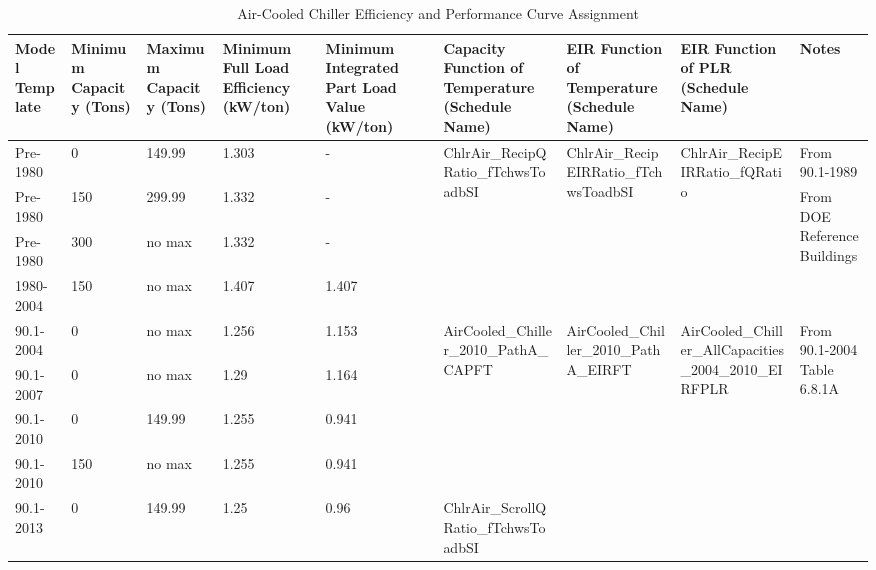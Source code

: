 \begin{table}
\scriptsize
\centering
\caption{Air-Cooled Chiller Efficiency and Performance Curve Assignment}
\label{tab:acc_efficiencies}
\begin{tabular}{|p{0.6in}|p{0.4in}|p{0.4in}|p{0.4in}|p{0.4in}|p{0.6in}|p{0.6in}|p{0.6in}|p{0.6in}|}
\hline
\textbf{Model Template} &
  \textbf{Minimum Capacity (Tons)} &
  \textbf{Maximum Capacity (Tons)} &
  \textbf{Minimum Full   Load Efficiency (kW/ton)} &
  \textbf{Minimum   Integrated Part Load Value (kW/ton)} &
  \textbf{Capacity Function of Temperature (Schedule Name)} &
  \textbf{EIR Function of Temperature  (Schedule Name)} &
  \textbf{EIR Function of PLR (Schedule Name)} &
  \textbf{Notes} \\ \hline
Pre-1980 & 0 & 149.99 & 1.303 & - &
  \multirow{4}{*}{\parbox{0.6in}{ChlrAir\_RecipQRatio\_fTchwsToadbSI}} &
  \multirow{4}{*}{\parbox{0.6in}{ChlrAir\_RecipEIRRatio\_fTchwsToadbSI}} &
  \multirow{4}{*}{\parbox{0.6in}{ChlrAir\_RecipEIRRatio\_fQRatio}} & From   90.1-1989 \\ \cline{1-5} \cline{9-9} 
Pre-1980  & 150 & 299.99   & 1.332 & -     &  &  &  & \multirow{3}{*}{\parbox{0.6in}{From DOE Reference Buildings}} \\ \cline{1-5}
Pre-1980  & 300 & no max   & 1.332 & -     &  &  &  &                                               \\ \cline{1-5}
1980-2004 & 150 & no max   & 1.407 & 1.407 &  &  &  &                                               \\ \hline
90.1-2004 &  0 & no max    & 1.256 & 1.153 &
  \multirow{4}{*}{\parbox{0.6in}{AirCooled\_Chiller\_2010\_PathA\_CAPFT}} &
  \multirow{4}{*}{\parbox{0.6in}{AirCooled\_Chiller\_2010\_PathA\_EIRFT}} &
  \multirow{4}{*}{\parbox{0.6in}{AirCooled\_Chiller\_AllCapacities\_2004\_2010\_EIRFPLR}} &
  \multirow{4}{*}{\parbox{0.6in}{From 90.1-2004 Table 6.8.1A}} \\ \cline{1-5}
90.1-2007         & 0   & no max   & 1.29  & 1.164 &  &  &  &                                               \\ \cline{1-5}
90.1-2010         & 0   & 149.99   & 1.255 & 0.941 &  &  &  &                                               \\ \cline{1-5}
90.1-2010         & 150 & no max   & 1.255 & 0.941 &  &  &  &                                               \\ \hline
90.1-2013         & 0   & 149.99   & 1.25  & 0.96 &
  \multirow{8}{*}{\parbox{0.6in}{ChlrAir\_ScrollQRatio\_fTchwsToadbSI}} &

\end{tabular}
\end{table}

